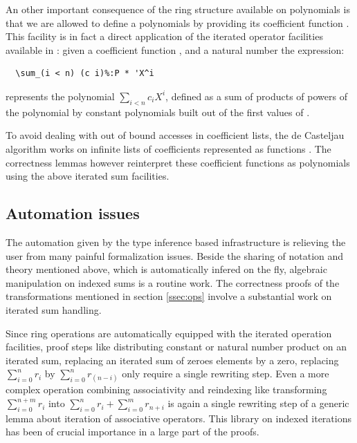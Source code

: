 \documentclass{mscs}
\begin{document}
An other important consequence of the ring structure available on
polynomials is that we are allowed to
define a polynomials by providing its coefficient function
. This facility is
in fact a direct application of the iterated operator facilities
available in \ssr{} \cite{bigops}: given a coefficient function
, and a natural number  the expression:
\begin{lstlisting}
  \sum_(i < n) (c i)%:P * 'X^i
\end{lstlisting}
represents the polynomial $\sum_{i < n}c_i X^i$, defined as a sum of
products of powers of the polynomial  by constant polynomials
built out of the first values of .

To avoid dealing with out of bound accesses in coefficient lists, the
de Casteljau algorithm works on infinite lists of coefficients
represented as functions . The correctness lemmas
however reinterpret these coefficient functions as polynomials using
the above iterated sum facilities.



\subsection{Automation issues}

The automation given by the type inference based infrastructure is
relieving the user from many painful formalization issues. Beside the
sharing of notation and theory mentioned above, which is automatically
infered on the fly, algebraic manipulation on indexed sums is a
routine work. The correctness proofs of the transformations mentioned
in section \ref{ssec:ops} involve a substantial work on iterated sum
handling.

Since ring operations are automatically equipped with the iterated
operation facilities, proof steps like distributing constant or
natural number product on an iterated sum, replacing an iterated sum
of zeroes elements by a zero, replacing $\sum_{i = 0}^n r_i$ by
$\sum_{i = 0}^n r_(n - i)$ only require a single rewriting step.
Even a  more complex operation combining associativity and reindexing
like transforming $\sum_{i = 0}^{n + m} r_i$ into
$\sum_{i = 0}^{n} r_i + \sum_{i = 0}^{m} r_{n + i}$ is again a single
rewriting step of a generic lemma about iteration of associative
operators. This \ssr{} library on indexed iterations has been of crucial
importance in a large part of the proofs.
\end{document}

